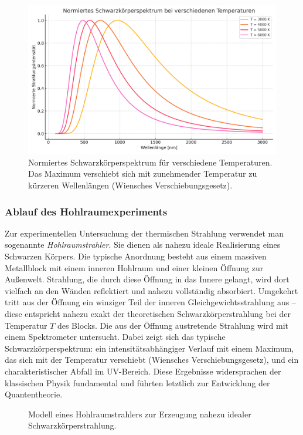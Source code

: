 \begin{figure}[H]
	\centering
	\includegraphics[width=0.85\linewidth]{bilder/schwarzer_koerper_spektrum.png}
	\caption{Normiertes Schwarzkörperspektrum für verschiedene Temperaturen. Das Maximum verschiebt sich mit zunehmender Temperatur zu kürzeren Wellenlängen (Wiensches Verschiebungsgesetz).}
	\label{fig:schwarzerkoerper}
\end{figure}

\subsubsection{Ablauf des Hohlraumexperiments}

Zur experimentellen Untersuchung der thermischen Strahlung verwendet man sogenannte \emph{Hohlraumstrahler}. Sie dienen als nahezu ideale Realisierung eines Schwarzen Körpers. Die typische Anordnung besteht aus einem massiven Metallblock mit einem inneren Hohlraum und einer kleinen Öffnung zur Außenwelt.
Strahlung, die durch diese Öffnung in das Innere gelangt, wird dort vielfach an den Wänden reflektiert und nahezu vollständig absorbiert. Umgekehrt tritt aus der Öffnung ein winziger Teil der inneren Gleichgewichtsstrahlung aus – diese entspricht nahezu exakt der theoretischen Schwarzkörperstrahlung bei der Temperatur \( T \) des Blocks.
Die aus der Öffnung austretende Strahlung wird mit einem Spektrometer untersucht. Dabei zeigt sich das typische Schwarzkörperspektrum: ein intensitätsabhängiger Verlauf mit einem Maximum, das sich mit der Temperatur verschiebt (Wiensches Verschiebungsgesetz), und ein charakteristischer Abfall im UV-Bereich. Diese Ergebnisse widersprachen der klassischen Physik fundamental und führten letztlich zur Entwicklung der Quantentheorie.

\begin{figure}[H]
	\centering
	\caption{Modell eines Hohlraumstrahlers zur Erzeugung nahezu idealer Schwarzkörperstrahlung.}
\end{figure}
\newpage
\noindent
